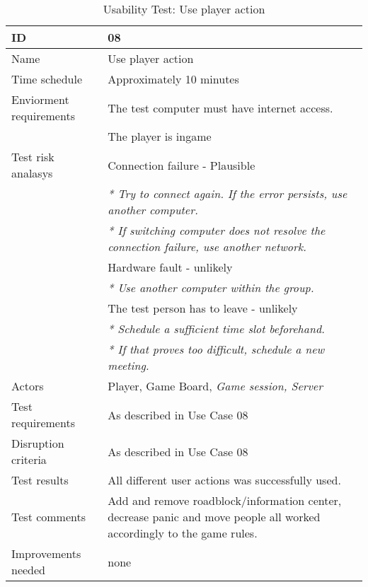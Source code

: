 {\footnotesize
\begin{table}[H]
\begin{tabular}{| p{5cm} | p{10cm} |}\hline
	\textbf{ID}	& \textbf{08} \\ \hline
	Name		& Use player action\\ \hline
	Time schedule	& Approximately 10 minutes\\ \hline
	Enviorment requirements 
		& The test computer must have internet access. \\ 
		& The player is ingame\\ \hline
	Test risk analasys 
		& Connection failure - Plausible \\
		& \emph{* Try to connect again. If the error persists, use another computer.} \\
		& \emph{* If switching computer does not resolve the connection failure, use another network.}\\
		& Hardware fault - unlikely \\
		& \emph{* Use another computer within the group.} \\
		& The test person has to leave - unlikely \\
		& \emph{* Schedule a sufficient time slot beforehand.} \\
		& \emph{* If that proves too difficult, schedule a new meeting.}\\ \hline
	Actors	& Player, Game Board, \emph{Game session, Server}\\ \hline
	Test requirements & As described in Use Case 08 \\ \hline
	Disruption criteria & As described in Use Case 08  \\ \hline
	Test results & All different user actions was successfully used. \\ \hline
	Test comments & Add and remove roadblock/information center, decrease panic and move people all worked accordingly to the game rules. \\ \hline
	Improvements needed & none \\ \hline
\end{tabular}


\caption{Usability Test: Use player action}
\label{fig:usability_test_8}
\end{table}}






